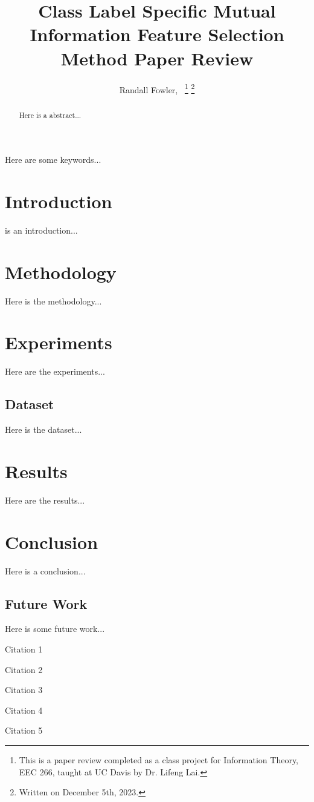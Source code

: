 \documentclass[conference]{IEEEtran}
\begin{document}
\title{Class Label Specific Mutual Information Feature Selection Method Paper Review}

\author{Randall Fowler,~
\thanks{This is a paper review completed as a class project for Information Theory, EEC 266, taught at UC Davis by Dr. Lifeng Lai.}
\thanks{Written on December 5th, 2023.}}

\maketitle

\begin{abstract}
Here is a abstract...
\end{abstract}

\begin{IEEEkeywords}
Here are some keywords...
\end{IEEEkeywords}

\section{Introduction}
 is an introduction...

\section{Methodology}
Here is the methodology...

\section{Experiments}
Here are the experiments...

\subsection{Dataset}
Here is the dataset...

\section{Results}
Here are the results...

\section{Conclusion}%
Here is a conclusion...


\subsection{Future Work}
Here is some future work...


\begin{thebibliography}{1}


Citation 1

Citation 2

Citation 3

Citation 4

Citation 5

\end{thebibliography}
\end{document}
